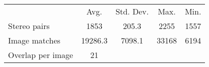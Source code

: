 \begin{table} 
    \begin{tabular}{ l c c c c }
                     & Avg. & Std. Dev. & Max. & Min. \\
        Stereo pairs & 1853 & 205.3 & 2255 & 1557  \\ 
        Image matches & 19286.3 & 7098.1 & 33168 & 6194 &  \\ 
        Overlap per image & 21  \\ 
    \end{tabular} 
\end{table}
